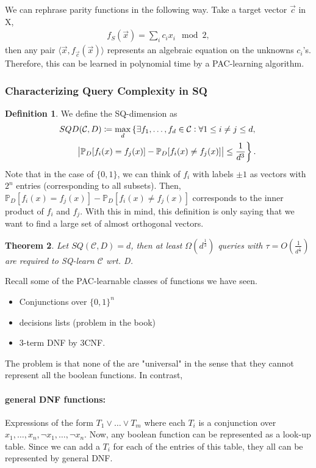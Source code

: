 \documentclass[12pt, letterpaper]{article}
\numberwithin{equation}{section} %
\newcommand{\mb}{\mathbb}
\newcommand{\mc}{\mathcal}
\newtheorem{theorem}{Theorem}[section]
\theoremstyle{definition}
\newtheorem{definition}[theorem]{Definition}
\theoremstyle{remark}
\begin{document}
We can rephrase parity functions in the following way. Take a target vector $\vec c$ in X,
\begin{align}
f_S(\vec x) = \sum_ic_ix_i \mod 2,
\end{align}
then any pair  $\langle \vec x, f_{\vec c}(\vec x)\rangle$ represents an algebraic equation on the unknowns $c_i$'s. Therefore, this can be learned in polynomial time by a PAC-learning algorithm.

\subsubsection{Characterizing Query Complexity in SQ}
\begin{definition}
We define the SQ-dimension as
\begin{multline}
SQD(\mc C, D) \coloneqq \max_d \left\{ \exists f_1,\ldots,f_d\in \mc C : \forall 1\leq i \ne j\leq d,\right.\\
\quad\quad \left.\abs{\mb P_D[f_i(x)=f_j(x)] - \mb P_D[f_i(x)\ne f_j(x)]}\leq \frac1{d^3}\right\}.
\end{multline}
Note that in the case of $\lbrace 0, 1\rbrace$, we can think of $f_i$ with labels $\pm 1$ as vectors with $2^n$ entries (corresponding to all subsets). Then, $\mb P_D[f_i(x)=f_j(x)]  - \mb P_D[f_i(x)\ne f_j(x)]$ corresponds to the inner product of $f_i$ and $f_j$. With this in mind, this definition is only saying that we want to find a large set of almost orthogonal vectors.
\end{definition}

\begin{theorem}
Let $SQ(\mc C, D)=d$, then at least $\Omega\left(d^\frac13\right)$ queries with $\tau = O\left(\frac1{d^\frac13}\right)$ are required to SQ-learn $\mc C$ wrt. D.
\end{theorem}

Recall some of the PAC-learnable classes of functions we have seen.
\begin{itemize}
\item Conjunctions over $\lbrace 0, 1\rbrace^n$
\item decisions lists (problem in the book)
\item 3-term DNF by 3CNF.
\end{itemize}
The problem is that none of the are "universal" in the sense that they cannot represent all the boolean functions. In contrast,
\paragraph{general DNF functions:} Expressions of the form $T_1\lor\ldots\lor T_m$ where each $T_i$ is a conjunction over $x_1,\ldots,x_n,\lnot x_1,\ldots,\lnot x_n$. Now, any boolean function can be represented as a look-up table. Since we can add a $T_i$ for each of the entries of this table, they all can be represented by general DNF.
\end{document}

